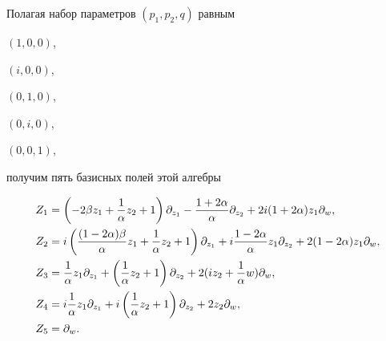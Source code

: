 Полагая набор параметров $ ( p_1,p_2,q) $ равным 


$ ( 1,0,0) $,


$ ( i,0,0) $,


$ ( 0,1,0) $,


$ ( 0,i,0) $,


$ ( 0,0,1) $, 


получим пять базисных полей этой алгебры


\begin{align} 


 Z_1 &= 


\left( -2\beta z_1 + \frac1{\alpha} z_2 + 1 \right) 


{\partial}_{z_1} 


- \frac{1 + 2\alpha}{\alpha} 


{\partial}_{z_2} 


+ 2 i (1 + 2\alpha) z_1 {\partial}_{w},\notag  \\


%


 Z_2 &= 


i \left( \frac{ ( 1 - 2\alpha) \beta }{\alpha} 


 z_1 + \frac1{\alpha} z_2 + 1 \right) 


{\partial}_{z_1} 


+ i  \frac{1 - 2\alpha}{\alpha} z_1


{\partial}_{z_2} 


+ 2 (1 - 2\alpha) z_1 {\partial}_{w}, \notag \\


%


 Z_3 &= 


 \frac1{\alpha} z_1 


{\partial}_{z_1} +


 \left( \frac1{\alpha} z_2 + 1 \right) 


{\partial}_{z_2} 


+ 2 ( i z_2 + \frac1{\alpha} w ) {\partial}_{w}, \\


%


 Z_4 &= 


 i \frac1{\alpha} z_1 


{\partial}_{z_1} +


 i \left( \frac1{\alpha} z_2 + 1 \right) 


{\partial}_{z_2} 


+ 2 z_2 {\partial}_{w}, \notag \\


%


 Z_5 &= {\partial}_{w}.\notag


\end{align}


